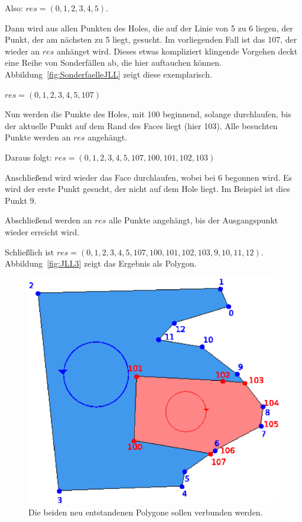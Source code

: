 Also: $res=(0, 1, 2, 3, 4, 5)$.

Dann wird aus allen Punkten des Holes, die auf der Linie von 5 zu 6 liegen, der Punkt, der am nächsten zu 5 liegt,  gesucht. Im vorliegenden Fall ist das 107, der wieder an $res$ anhänget wird. Dieses etwas kompliziert klingende Vorgehen deckt eine Reihe von Sonderfällen ab, die hier auftauchen können. Abbildung~\vref{fig:SonderfaelleJLL} zeigt diese exemplarisch.

$res=(0, 1, 2, 3, 4, 5, 107)$

Nun werden die Punkte des Holes,  mit 100 beginnend, solange durchlaufen, bis der aktuelle Punkt auf dem Rand des Faces liegt (hier 103). Alle besuchten Punkte werden an $res$ angehängt.

Daraus folgt: $res=(0, 1, 2, 3, 4, 5, 107, 100, 101, 102, 103)$

Anschließend wird wieder das Face durchlaufen, wobei bei 6 begonnen wird. Es wird  der erste Punkt  gesucht, der nicht auf dem Hole liegt. Im Beispiel ist dies Punkt 9.

Abschließend werden an $res$ alle Punkte angehängt, bis der Ausgangspunkt wieder erreicht wird.

Schließlich ist $res=(0, 1, 2, 3, 4, 5, 107, 100, 101, 102, 103, 9, 10, 11, 12)$. Abbildung~\vref{fig:JLL3} zeigt das Ergebnis als Polygon.


\begin{figure}
	\centering
	\includegraphics[scale=0.6]{JLL2.svg.eps}
	\caption{Die beiden neu entstandenen Polygone sollen verbunden werden.}
	\label{fig:JLL2}
\end{figure}


